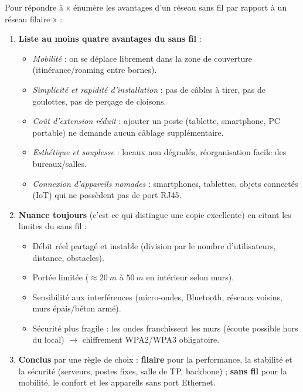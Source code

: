 \documentclass[11pt]{article}
\begin{document}
\begin{methode}
Pour répondre à « énumère les avantages d'un réseau sans fil par rapport à un réseau filaire » :
\begin{enumerate}
  \item \textbf{Liste au moins quatre avantages du sans fil} :
  \begin{itemize}
    \item \emph{Mobilité} : on se déplace librement dans la zone de couverture (itinérance/roaming entre bornes).
    \item \emph{Simplicité et rapidité d'installation} : pas de câbles à tirer, pas de goulottes, pas de perçage de cloisons.
    \item \emph{Coût d'extension réduit} : ajouter un poste (tablette, smartphone, PC portable) ne demande aucun câblage supplémentaire.
    \item \emph{Esthétique et souplesse} : locaux non dégradés, réorganisation facile des bureaux/salles.
    \item \emph{Connexion d'appareils nomades} : smartphones, tablettes, objets connectés (IoT) qui ne possèdent pas de port RJ45.
  \end{itemize}
  \item \textbf{Nuance toujours} (c'est ce qui distingue une copie excellente) en citant les limites du sans fil :
  \begin{itemize}
    \item Débit réel partagé et instable (division par le nombre d'utilisateurs, distance, obstacles).
    \item Portée limitée ($\approx \SI{20}{m}$ à $\SI{50}{m}$ en intérieur selon murs).
    \item Sensibilité aux interférences (micro-ondes, Bluetooth, réseaux voisins, murs épais/béton armé).
    \item Sécurité plus fragile : les ondes franchissent les murs (écoute possible hors du local) $\rightarrow$ chiffrement WPA2/WPA3 obligatoire.
  \end{itemize}
  \item \textbf{Conclus} par une règle de choix : \textbf{filaire} pour la performance, la stabilité et la sécurité (serveurs, postes fixes, salle de TP, backbone) ; \textbf{sans fil} pour la mobilité, le confort et les appareils sans port Ethernet.
\end{enumerate}
\end{methode}
\end{document}
